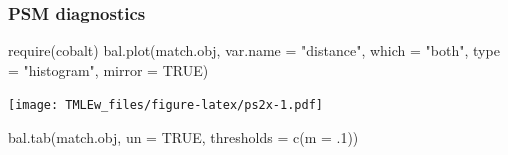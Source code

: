 \documentclass[
]{book}
\newenvironment{Shaded}{\begin{snugshade}}{\end{snugshade}}
\newcommand{\AttributeTok}[1]{\textcolor[rgb]{0.77,0.63,0.00}{#1}}
\newcommand{\ConstantTok}[1]{\textcolor[rgb]{0.00,0.00,0.00}{#1}}
\newcommand{\DecValTok}[1]{\textcolor[rgb]{0.00,0.00,0.81}{#1}}
\newcommand{\FunctionTok}[1]{\textcolor[rgb]{0.00,0.00,0.00}{#1}}
\newcommand{\NormalTok}[1]{#1}
\newcommand{\StringTok}[1]{\textcolor[rgb]{0.31,0.60,0.02}{#1}}
\begin{document}
\hypertarget{psm-diagnostics}{%
\subsubsection{PSM diagnostics}\label{psm-diagnostics}}

\begin{Shaded}
\begin{Highlighting}[]
\FunctionTok{require}\NormalTok{(cobalt)}
\FunctionTok{bal.plot}\NormalTok{(match.obj,  }
         \AttributeTok{var.name =} \StringTok{"distance"}\NormalTok{, }
         \AttributeTok{which =} \StringTok{"both"}\NormalTok{, }
         \AttributeTok{type =} \StringTok{"histogram"}\NormalTok{,  }
         \AttributeTok{mirror =} \ConstantTok{TRUE}\NormalTok{)}
\end{Highlighting}
\end{Shaded}

\texttt{[image: TMLEw\_files/figure-latex/ps2x-1.pdf]}

\begin{Shaded}
\begin{Highlighting}[]
\FunctionTok{bal.tab}\NormalTok{(match.obj, }\AttributeTok{un =} \ConstantTok{TRUE}\NormalTok{, }
        \AttributeTok{thresholds =} \FunctionTok{c}\NormalTok{(}\AttributeTok{m =}\NormalTok{ .}\DecValTok{1}\NormalTok{))}
\end{Highlighting}
\end{Shaded}
\end{document}
